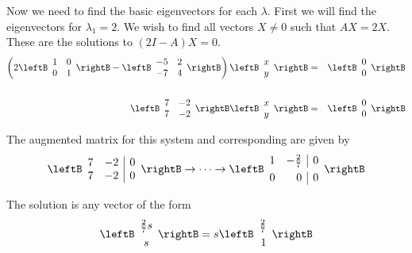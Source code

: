 \begin{solution}
Now we need to find the basic eigenvectors for each $\lambda$. First we will find the eigenvectors for $\lambda_1 = 2$. We wish to find all vectors $X \neq 0$ such that $AX = 2X$. These are the solutions to $(2I - A)X = 0$. 
\begin{eqnarray*}
\left( 
2 \leftB \begin{array}{rr}
1 & 0 \\
0 & 1 
\end{array}\rightB - 
\leftB \begin{array}{rr}
-5 & 2 \\
-7 & 4
\end{array}\rightB
 \right) \leftB \begin{array}{c}
x \\
y 
\end{array}\rightB &=& \leftB \begin{array}{r}
0 \\
0
\end{array} \rightB \\
\\
\leftB \begin{array}{rr}
7 & -2 \\
7 & -2
\end{array}\rightB \leftB \begin{array}{c}
x \\
y 
\end{array}\rightB &=& \leftB \begin{array}{r}
0 \\
0
\end{array} \rightB 
\end{eqnarray*}

The augmented matrix for this system and corresponding \rref \;are given by 
\[
\leftB \begin{array}{rr|r}
7 & -2 & 0 \\
7 & -2 & 0
\end{array}\rightB 
\rightarrow \cdots \rightarrow 
\leftB \begin{array}{rr|r}
1 & -\vspace{0.05in}\frac{2}{7} & 0 \\
0 & 0 & 0 
\end{array} \rightB 
\]

The solution is any vector of the form
\[
\leftB \begin{array}{c}
\vspace{0.05in}\frac{2}{7}s \\
s
\end{array} \rightB
=
s
\leftB \begin{array}{r}
\vspace{0.05in}\frac{2}{7} \\
1
\end{array} \rightB
\]


\end{solution}
